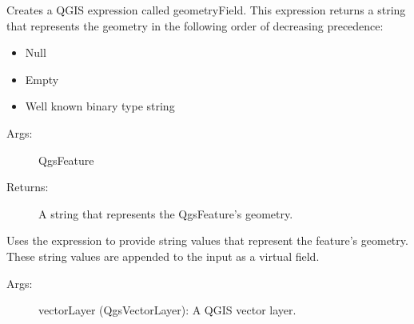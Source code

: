 \documentclass[letterpaper,11pt,english]{sphinxmanual}
\begin{document}
\begin{fulllineitems}
\label{\detokenize{API:parseQGISGeometry.geometryField}}
Creates a QGIS expression called geometryField.  This expression returns a string that represents the geometry in
the following order of decreasing precedence:
\begin{itemize}
\item {} 
Null

\item {} 
Empty

\item {} 
Well known binary type string

\end{itemize}
\begin{description}
\item[{Args:}] \leavevmode
QgsFeature

\item[{Returns:}] \leavevmode
A string that represents the QgsFeature’s geometry.

\end{description}

\end{fulllineitems}


\begin{fulllineitems}
\label{\detokenize{API:parseQGISGeometry.layerAddVirtualGeometryField}}
Uses the  expression to provide string values that represent the feature’s geometry.  These string
values are appended to the input  as a virtual field.
\begin{description}
\item[{Args:}] \leavevmode
vectorLayer (QgsVectorLayer):  A QGIS vector layer.

\end{description}

\end{fulllineitems}

\end{document}
